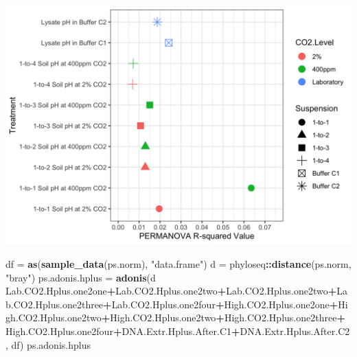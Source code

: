 \documentclass[]{article}
\newenvironment{Shaded}{\begin{snugshade}}{\end{snugshade}}
\newcommand{\KeywordTok}[1]{\textcolor[rgb]{0.13,0.29,0.53}{\textbf{#1}}}
\newcommand{\NormalTok}[1]{#1}
\newcommand{\OperatorTok}[1]{\textcolor[rgb]{0.81,0.36,0.00}{\textbf{#1}}}
\newcommand{\StringTok}[1]{\textcolor[rgb]{0.31,0.60,0.02}{#1}}
\begin{document}
\includegraphics{output-rmd/rsq-permanova-plot-ph-1.png}

\begin{Shaded}
\begin{Highlighting}[]
\NormalTok{df =}\StringTok{ }\KeywordTok{as}\NormalTok{(}\KeywordTok{sample_data}\NormalTok{(ps.norm), }\StringTok{"data.frame"}\NormalTok{)}
\NormalTok{d =}\StringTok{ }\NormalTok{phyloseq}\OperatorTok{::}\KeywordTok{distance}\NormalTok{(ps.norm, }\StringTok{"bray"}\NormalTok{) }
\NormalTok{ps.adonis.hplus =}\StringTok{ }\KeywordTok{adonis}\NormalTok{(d }\OperatorTok{~}\StringTok{ }\NormalTok{Lab.CO2.Hplus.one2one}\OperatorTok{+}\NormalTok{Lab.CO2.Hplus.one2two}\OperatorTok{+}\NormalTok{Lab.CO2.Hplus.one2two}\OperatorTok{+}\NormalTok{Lab.CO2.Hplus.one2three}\OperatorTok{+}\NormalTok{Lab.CO2.Hplus.one2four}\OperatorTok{+}\NormalTok{High.CO2.Hplus.one2one}\OperatorTok{+}\NormalTok{High.CO2.Hplus.one2two}\OperatorTok{+}\NormalTok{High.CO2.Hplus.one2two}\OperatorTok{+}\NormalTok{High.CO2.Hplus.one2three}\OperatorTok{+}\NormalTok{High.CO2.Hplus.one2four}\OperatorTok{+}\NormalTok{DNA.Extr.Hplus.After.C1}\OperatorTok{+}\NormalTok{DNA.Extr.Hplus.After.C2, df)}
\NormalTok{ps.adonis.hplus}
\end{Highlighting}
\end{Shaded}
\end{document}
